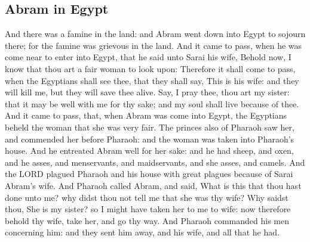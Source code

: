 \begin{biblechapter}
\section*{Abram in Egypt}
\verse And there was a famine in the land: and Abram went down into Egypt to sojourn there; for the famine was grievous in the land.
\verse And it came to pass, when he was come near to enter into Egypt, that he said unto Sarai his wife, Behold now, I know that thou art a fair woman to look upon:
\verse Therefore it shall come to pass, when the Egyptians shall see thee, that they shall say, This is his wife: and they will kill me, but they will save thee alive.
\verse Say, I pray thee, thou art my sister: that it may be well with me for thy sake; and my soul shall live because of thee.
\verse And it came to pass, that, when Abram was come into Egypt, the Egyptians beheld the woman that she was very fair.
\verse The princes also of Pharaoh saw her, and commended her before Pharaoh: and the woman was taken into Pharaoh's house.
\verse And he entreated Abram well for her sake: and he had sheep, and oxen, and he asses, and menservants, and maidservants, and she asses, and camels.
\verse And the LORD plagued Pharaoh and his house with great plagues because of Sarai Abram's wife.
\verse And Pharaoh called Abram, and said, What is this that thou hast done unto me? why didst thou not tell me that she was thy wife?
\verse Why saidst thou, She is my sister? so I might have taken her to me to wife: now therefore behold thy wife, take her, and go thy way.
\verse And Pharaoh commanded his men concerning him: and they sent him away, and his wife, and all that he had.
\end{biblechapter}

